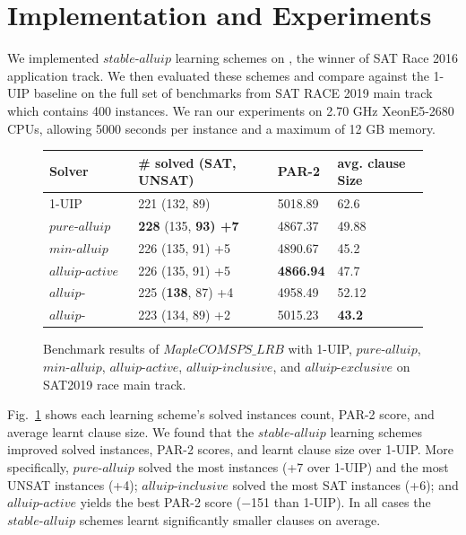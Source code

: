\documentclass[runningheads]{llncs}
\newcommand{\oneuip}{1-UIP\xspace}
\newcommand{\stablealluip}{\textit{stable-alluip}\xspace}
\newcommand{\allUipPure}{\textit{pure-alluip}\xspace}
\newcommand{\allUipMin}{\textit{min-alluip}\xspace}
\newcommand{\allUipAct}{\textit{alluip-active}}
\newcommand{\allUipIn}{\textit{alluip-inclusive}}
\newcommand{\allUipEx}{\textit{alluip-exclusive}}
\newcommand{\MapleBase}{\textit{MapleCOMSPS\_LRB}}
\begin{document}
\section{Implementation and Experiments}
We implemented $\stablealluip$ learning schemes on \text{\MapleBase}
\cite{liang2016maple}, the winner of SAT Race 2016 application
track. We then evaluated these schemes and compare against the \oneuip
baseline on the full set of benchmarks from SAT RACE 2019 main track
which contains 400 instances. We ran our experiments on 2.70 GHz
XeonE5-2680 CPUs, allowing
5000 seconds per instance and a maximum of 12 GB memory.

\begin{figure} 
\begin{center}
\begin{tabular}{ | m{3.2cm} | m{3.8cm}| m{2cm} | m{2.75cm} |  } 
\hline
Solver & \# solved (SAT, UNSAT) & PAR-2 & avg. clause Size \\ 
\hline
\oneuip & 221 (132, 89)  & 5018.89 & 62.6  \\ 
\hline
$\allUipPure$ &\textbf{228} (135, \bf{93}) +7 & 4867.37 & 49.88 \\
\hline
$\allUipMin$ & 226 (135, 91) +5 & 4890.67 & 45.2 \\ 
\hline
$\allUipAct$ & 226 (135, 91)  +5 & \textbf{4866.94} & 47.7 \\
\hline
$\allUipIn$ & 225 (\textbf{138}, 87) +4 & 4958.49 & 52.12 \\
\hline
$\allUipEx$ & 223 (134, 89) +2& 5015.23& \textbf{43.2} \\
\hline
\end{tabular}
\end{center}
\caption{Benchmark results of $\MapleBase$ with \oneuip, $\allUipPure$, $\allUipMin$, $\allUipAct$,
$\allUipIn$, and $\allUipEx$ on SAT2019 race main track.}
\label{fig:t4}
\end{figure}


Fig.~\ref{fig:t4} shows each learning scheme's solved instances count,
PAR-2 score, and average learnt clause size. We found that the
$\stablealluip$ learning schemes improved solved instances, PAR-2 scores,
and learnt clause size over \oneuip. More specifically, $\allUipPure$
solved the most instances (+7 over \oneuip) and the most UNSAT instances
(+4); $\allUipIn$ solved the most SAT instances (+6); and $\allUipAct$
yields the best PAR-2 score ($-$151 than \oneuip). In all cases the
$\stablealluip$ schemes learnt significantly smaller clauses on average.
\end{document}
